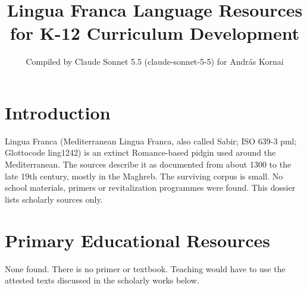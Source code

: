 \documentclass[12pt]{article}
\title{Lingua Franca Language Resources for K-12 Curriculum Development}
\author{Compiled by Claude Sonnet 5.5 (claude-sonnet-5-5) for Andr\'as Kornai}
\date{}
\begin{document}
\maketitle

\section{Introduction}
Lingua Franca (Mediterranean Lingua Franca, also called Sabir; ISO 639-3 pml; Glottocode ling1242) is an extinct Romance-based pidgin used around the Mediterranean. The sources describe it as documented from about 1300 to the late 19th century, mostly in the Maghreb. The surviving corpus is small. No school materials, primers or revitalization programmes were found. This dossier lists scholarly sources only.

\section{Primary Educational Resources}
None found. There is no primer or textbook. Teaching would have to use the attested texts discussed in the scholarly works below.
\end{document}
